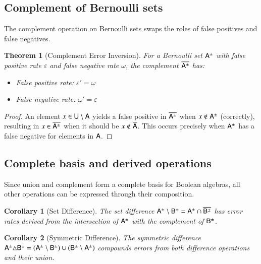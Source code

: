 \documentclass[10pt,final,hidelinks]{article}
\numberwithin{equation}{section}
\newcommand{\fprate}{\varepsilon}
\newcommand{\fnrate}{\omega}
\newcommand{\envnumstyle}{chapter}
\renewcommand{\envnumstyle}{chapter}
\renewcommand{\envnumstyle}{section}
\theoremstyle{plain}
\newtheorem{theorem}{Theorem}[\envnumstyle]
\newtheorem{corollary}{Corollary}[theorem]
\begin{document}
\subsection{Complement of Bernoulli sets}

The complement operation on Bernoulli sets swaps the roles of false positives and false negatives.

\begin{theorem}[Complement Error Inversion]
\label{thm:complement_error}
For a Bernoulli set $\ASet{A}$ with false positive rate $\fprate$ and false negative rate $\fnrate$, the complement $\overline{\ASet{A}}$ has:
\begin{itemize}
\item False positive rate: $\fprate' = \fnrate$
\item False negative rate: $\fnrate' = \fprate$
\end{itemize}
\end{theorem}

\begin{proof}
An element $x \in \Set{U} \setminus \Set{A}$ yields a false positive in $\overline{\ASet{A}}$ when $x \notin \ASet{A}$ (correctly), resulting in $x \in \overline{\ASet{A}}$ when it should be $x \notin \overline{\Set{A}}$. This occurs precisely when $\ASet{A}$ has a false negative for elements in $\Set{A}$.
\end{proof}

\subsection{Complete basis and derived operations}

Since union and complement form a complete basis for Boolean algebras, all other operations can be expressed through their composition.

\begin{corollary}[Set Difference]
The set difference $\ASet{A} \setminus \ASet{B} = \ASet{A} \cap \overline{\ASet{B}}$ has error rates derived from the intersection of $\ASet{A}$ with the complement of $\ASet{B}$.
\end{corollary}

\begin{corollary}[Symmetric Difference]
The symmetric difference $\ASet{A} \triangle \ASet{B} = (\ASet{A} \setminus \ASet{B}) \cup (\ASet{B} \setminus \ASet{A})$ compounds errors from both difference operations and their union.
\end{corollary}
\end{document}
